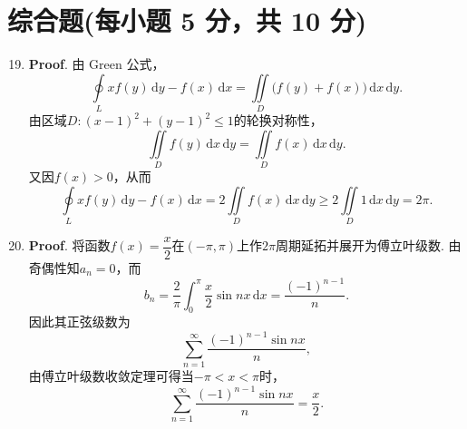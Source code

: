 \documentclass[../Main.tex]{subfiles}
\begin{document}
\section{综合题(每小题 5 分，共 10 分)}
\begin{enumerate}
    \setcounter{enumi}{18}
    \item \textbf{Proof}. 由 Green 公式，
          \[
              \oint\limits_{L}xf(y)\,\mathrm{d}y-f(x)\,\mathrm{d}x
              =\iint\limits_{D}\bigl(f(y)+f(x)\bigr)\,\mathrm{d}x\,\mathrm{d}y.
          \]
          由区域$D:(x-1)^{2}+(y-1)^{2}\le1$的轮换对称性，
          \[
              \iint\limits_{D}f(y)\,\mathrm{d}x\,\mathrm{d}y=\iint\limits_{D}f(x)\,\mathrm{d}x\,\mathrm{d}y.
          \]
          又因$f(x)>0$，从而
          \[
              \oint\limits_{L}xf(y)\,\mathrm{d}y-f(x)\,\mathrm{d}x
              =2\iint\limits_{D}f(x)\,\mathrm{d}x\,\mathrm{d}y\geq 2\iint\limits_{D}1\,\mathrm{d}x\,\mathrm{d}y=2\pi.
          \]

    \item \textbf{Proof}. 将函数$f(x)=\dfrac{x}{2}$在$(-\pi,\pi)$上作$2\pi$周期延拓并展开为傅立叶级数.
          由奇偶性知$a_{n}=0$，而
          \[
              b_{n}=\frac{2}{\pi}\int_{0}^{\pi}\frac{x}{2}\sin nx\,\mathrm{d}x=\frac{(-1)^{n-1}}{n}.
          \]
          因此其正弦级数为
          \[
              \sum_{n=1}^{\infty}\frac{(-1)^{n-1}\sin nx}{n},
          \]
          由傅立叶级数收敛定理可得当$-\pi<x<\pi$时，
          \[
              \sum_{n=1}^{\infty}\frac{(-1)^{n-1}\sin nx}{n}=\frac{x}{2}.
          \]
\end{enumerate}
\end{document}
